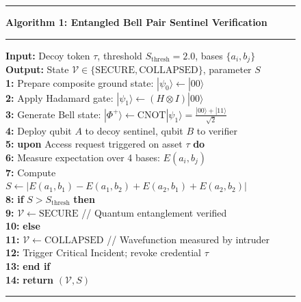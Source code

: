 \documentclass[journal,10pt]{IEEEtran}
\begin{document}
\begin{figure}[!t]
\centering
\begin{minipage}{0.48\textwidth}
\hrule\vspace{3pt}
\noindent\textbf{Algorithm 1: Entangled Bell Pair Sentinel Verification}
\vspace{3pt}\hrule\vspace{4pt}
\begin{small}
\noindent\textbf{Input:} Decoy token $\tau$, threshold $S_{\mathrm{thresh}} = 2.0$, bases $\{a_i, b_j\}$\\
\noindent\textbf{Output:} State $\mathcal{V} \in \{\text{SECURE}, \text{COLLAPSED}\}$, parameter $S$\\
\textbf{1:} Prepare composite ground state: $|\psi_0\rangle \leftarrow |00\rangle$\\
\textbf{2:} Apply Hadamard gate: $|\psi_1\rangle \leftarrow (H \otimes I)|00\rangle$\\
\textbf{3:} Generate Bell state: $|\Phi^+\rangle \leftarrow \mathrm{CNOT}|\psi_1\rangle = \frac{|00\rangle + |11\rangle}{\sqrt{2}}$\\
\textbf{4:} Deploy qubit $A$ to decoy sentinel, qubit $B$ to verifier\\
\textbf{5:} \textbf{upon} Access request triggered on asset $\tau$ \textbf{do}\\
\textbf{6:} \quad Measure expectation over 4 bases: $E(a_i, b_j)$\\
\textbf{7:} \quad Compute $S \leftarrow |E(a_1, b_1) - E(a_1, b_2) + E(a_2, b_1) + E(a_2, b_2)|$\\
\textbf{8:} \quad \textbf{if} $S > S_{\mathrm{thresh}}$ \textbf{then}\\
\textbf{9:} \quad\quad $\mathcal{V} \leftarrow \text{SECURE}$ \quad // Quantum entanglement verified\\
\textbf{10:} \quad \textbf{else}\\
\textbf{11:} \quad\quad $\mathcal{V} \leftarrow \text{COLLAPSED}$ \quad // Wavefunction measured by intruder\\
\textbf{12:} \quad\quad Trigger Critical Incident; revoke credential $\tau$\\
\textbf{13:} \quad \textbf{end if}\\
\textbf{14:} \textbf{return} $(\mathcal{V}, S)$\\
\end{small}
\vspace{2pt}\hrule
\end{minipage}
\hfill
\begin{minipage}{0.48\textwidth}

\end{minipage}
\end{figure}
\end{document}
